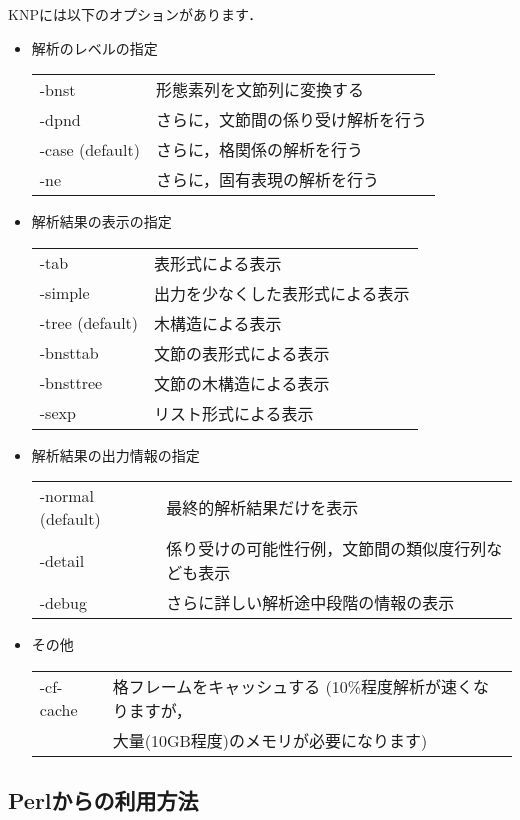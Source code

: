 \documentclass[a4j,11pt,titlepage]{jarticle}
\begin{document}
KNPには以下のオプションがあります．
\begin{itemize}
\item 解析のレベルの指定

\begin{tabular}{ll}
-bnst           & 形態素列を文節列に変換する \\
-dpnd           & さらに，文節間の係り受け解析を行う \\
-case (default) & さらに，格関係の解析を行う \\
-ne             & さらに，固有表現の解析を行う \\
\end{tabular}
\item 解析結果の表示の指定

\begin{tabular}{ll}
-tab            & 表形式による表示 \\
-simple         & 出力を少なくした表形式による表示 \\
-tree (default) & 木構造による表示 \\
-bnsttab        & 文節の表形式による表示 \\
-bnsttree       & 文節の木構造による表示 \\
-sexp           & リスト形式による表示 \\
\end{tabular}
\item 解析結果の出力情報の指定

\begin{tabular}{ll}
-normal (default) & 最終的解析結果だけを表示 \\
-detail           & 係り受けの可能性行例，文節間の類似度行列なども表示 \\
-debug            & さらに詳しい解析途中段階の情報の表示 \\
\end{tabular}
\item その他

\begin{tabular}{ll}
-cf-cache         & 格フレームをキャッシュする (10\%程度解析が速くなりますが，\\
                  & 大量(10GB程度)のメモリが必要になります) \\
\end{tabular}
\end{itemize}


\subsection{Perlからの利用方法}
\end{document}
